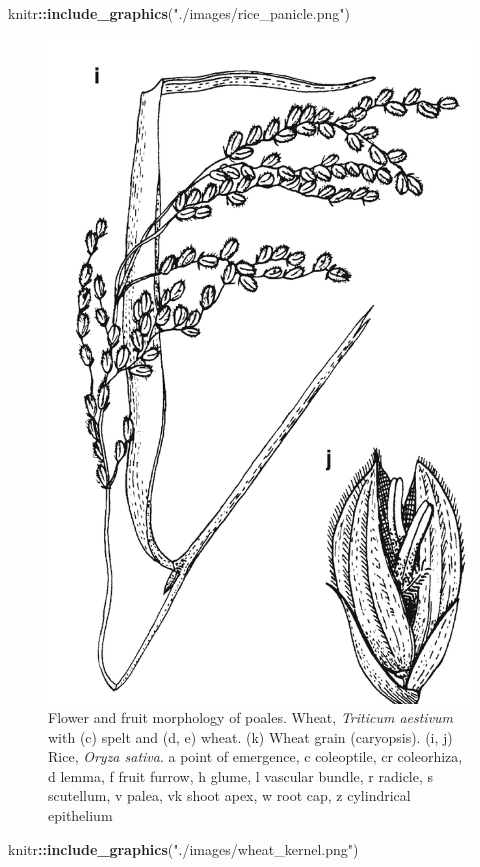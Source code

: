 \documentclass[]{book}
\newenvironment{Shaded}{\begin{snugshade}}{\end{snugshade}}
\newcommand{\KeywordTok}[1]{\textcolor[rgb]{0.13,0.29,0.53}{\textbf{#1}}}
\newcommand{\NormalTok}[1]{#1}
\newcommand{\OperatorTok}[1]{\textcolor[rgb]{0.81,0.36,0.00}{\textbf{#1}}}
\newcommand{\StringTok}[1]{\textcolor[rgb]{0.31,0.60,0.02}{#1}}
\begin{document}
\begin{Shaded}
\begin{Highlighting}[]
\NormalTok{knitr}\OperatorTok{::}\KeywordTok{include_graphics}\NormalTok{(}\StringTok{"./images/rice_panicle.png"}\NormalTok{)}
\end{Highlighting}
\end{Shaded}

\begin{figure}

{\centering \includegraphics[width=0.55\linewidth]{./images/rice_panicle} 

}

\caption{Flower and fruit morphology of poales. Wheat, \textit{Triticum aestivum} with (c) spelt and (d, e) wheat. (k) Wheat grain (caryopsis). (i, j) Rice, \textit{Oryza sativa}. a point of emergence, c coleoptile, cr coleorhiza, d lemma, f fruit furrow, h glume, l vascular bundle, r radicle, s scutellum, v palea, vk shoot apex, w root cap, z cylindrical epithelium}\label{fig:floral-morphology-poales}
\end{figure}

\begin{Shaded}
\begin{Highlighting}[]
\NormalTok{knitr}\OperatorTok{::}\KeywordTok{include_graphics}\NormalTok{(}\StringTok{"./images/wheat_kernel.png"}\NormalTok{)}
\end{Highlighting}
\end{Shaded}
\end{document}
